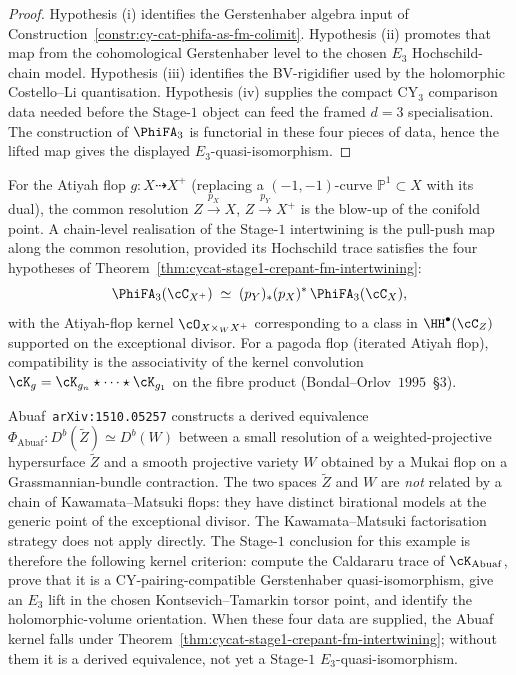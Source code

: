 \begin{proof}
Hypothesis \textup{(i)} identifies the Gerstenhaber algebra input of
Construction~\ref{constr:cy-cat-phifa-as-fm-colimit}. Hypothesis
\textup{(ii)} promotes that map from the cohomological Gerstenhaber
level to the chosen $E_3$ Hochschild-chain model. Hypothesis
\textup{(iii)} identifies the BV-rigidifier used by the holomorphic
Costello--Li quantisation. Hypothesis \textup{(iv)} supplies the
compact CY$_3$ comparison data needed before the Stage-$1$ object can
feed the framed $d=3$ specialisation. The construction of
$\PhiFA_3$ is functorial in these four pieces of data, hence the lifted
map gives the displayed $E_3$-quasi-isomorphism.
\end{proof}

\begin{remark}
\label{rem:cycat-atiyah-common-resolution}
For the Atiyah flop $g \colon X \dashrightarrow X^+$ (replacing a
$(-1,-1)$-curve $\mathbb{P}^1 \subset X$ with its dual), the common
resolution $Z \xrightarrow{p_X} X$, $Z \xrightarrow{p_Y} X^+$ is the
blow-up of the conifold point. A chain-level realisation of the
Stage-$1$ intertwining is the pull-push map along the common resolution,
provided its Hochschild trace satisfies the four hypotheses of
Theorem~\ref{thm:cycat-stage1-crepant-fm-intertwining}:
\[
 \PhiFA_3(\cC_{X^+}) \;\simeq\; (p_Y)_* (p_X)^* \, \PhiFA_3(\cC_X),
\]
with the Atiyah-flop kernel $\cO_{X \times_W X^+}$ corresponding to a
class in $\HH^\bullet(\cC_Z)$ supported on the exceptional divisor.
For a pagoda flop (iterated Atiyah flop), compatibility is the
associativity of the kernel convolution
$\cK_g = \cK_{g_n} \star \cdots \star \cK_{g_1}$ on the fibre product
(Bondal--Orlov~$1995$~\S $3$).
\end{remark}

\begin{remark}
\label{rem:cycat-abuaf-non-flop}
Abuaf~\texttt{arXiv:1510.05257} constructs a derived equivalence
$\Phi_{\mathrm{Abuaf}} \colon D^b(\widetilde Z) \simeq D^b(W)$ between
a small resolution of a weighted-projective hypersurface $\widetilde Z$
and a smooth projective variety $W$ obtained by a Mukai flop on a
Grassmannian-bundle contraction. The two spaces $\widetilde Z$ and $W$
are \emph{not} related by a chain of Kawamata--Matsuki flops: they have
distinct birational models at the generic point of the exceptional
divisor. The Kawamata--Matsuki factorisation strategy does not apply
directly. The Stage-$1$ conclusion for this example is therefore the
following kernel criterion: compute the Caldararu trace of
$\cK_{\mathrm{Abuaf}}$, prove that it is a CY-pairing-compatible
Gerstenhaber quasi-isomorphism, give an $E_3$ lift in the chosen
Kontsevich--Tamarkin torsor point, and identify the holomorphic-volume
orientation. When these four data are supplied, the Abuaf kernel falls
under Theorem~\ref{thm:cycat-stage1-crepant-fm-intertwining}; without
them it is a derived equivalence, not yet a Stage-$1$
$E_3$-quasi-isomorphism.
\end{remark}

